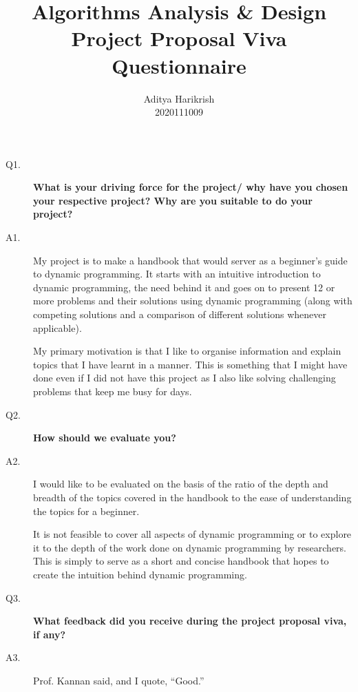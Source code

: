 \documentclass[12pt, a4paper]{article}
\title{Algorithms Analysis \& Design\\Project Proposal Viva Questionnaire}
\author{Aditya Harikrish\\2020111009}
\date{}
\theoremstyle{definition}
\theoremstyle{remark}
\begin{document}
\maketitle

\begin{description}
    \item[Q1.] \bfseries What is your driving force for the project/ why have you chosen your respective project? Why are you suitable to do your project?
        \normalfont
    \item[A1.] My project is to make a handbook that would server as a beginner's guide to dynamic programming. It starts with an intuitive introduction to dynamic programming, the need behind it and goes on to present 12 or more problems and their solutions using dynamic programming (along with competing solutions and a comparison of different solutions whenever applicable).

        My primary motivation is that I like to organise information and explain topics that I have learnt in a manner. This is something that I might have done even if I did not have this project as I also like solving challenging problems that keep me busy for days.

    \item[Q2.] \textbf{How should we evaluate you?}
    \item[A2.] I would like to be evaluated on the basis of the ratio of the depth and breadth of the topics covered in the handbook to the ease of understanding the topics for a beginner.

        It is not feasible to cover all aspects of dynamic programming or to explore it to the depth of the work done on dynamic programming by researchers. This is simply to serve as a short and concise handbook that hopes to create the intuition behind dynamic programming.

    \item[Q3.] \textbf{What feedback did you receive during the project proposal viva, if any?}
    \item[A3.] Prof. Kannan said, and I quote, ``Good.''
\end{description}
\end{document}
